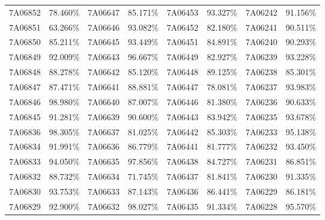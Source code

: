 \documentclass[12pt]{article}%
\begin{document}
\begin{longtable}{|cc|cc|cc|cc|}
7A06852              & 78.460\% & 7A06647              & 85.171\% & 7A06453              & 93.327\% & \multicolumn{1}{l}{7A06242             } & 91.156\% \\
7A06851              & 63.266\% & 7A06646              & 93.082\% & 7A06452              & 82.180\% & \multicolumn{1}{l}{7A06241             } & 90.511\% \\
7A06850              & 85.211\% & 7A06645              & 93.449\% & 7A06451              & 84.891\% & \multicolumn{1}{l}{7A06240             } & 90.293\% \\
7A06849              & 92.009\% & 7A06643              & 96.667\% & 7A06449              & 82.927\% & \multicolumn{1}{l}{7A06239             } & 93.228\% \\
7A06848              & 88.278\% & 7A06642              & 85.120\% & 7A06448              & 89.125\% & \multicolumn{1}{l}{7A06238             } & 85.301\% \\
7A06847              & 87.471\% & 7A06641              & 88.881\% & 7A06447              & 78.081\% & \multicolumn{1}{l}{7A06237             } & 93.983\% \\
7A06846              & 98.980\% & 7A06640              & 87.007\% & 7A06446              & 81.380\% & \multicolumn{1}{l}{7A06236             } & 90.633\% \\
7A06845              & 91.281\% & 7A06639              & 90.600\% & 7A06443              & 83.942\% & \multicolumn{1}{l}{7A06235             } & 93.678\% \\
7A06836              & 98.305\% & 7A06637              & 81.025\% & 7A06442              & 85.303\% & \multicolumn{1}{l}{7A06233             } & 95.138\% \\
7A06834              & 91.991\% & 7A06636              & 86.779\% & 7A06441              & 81.777\% & \multicolumn{1}{l}{7A06232             } & 93.450\% \\
7A06833              & 94.050\% & 7A06635              & 97.856\% & 7A06438              & 84.727\% & \multicolumn{1}{l}{7A06231             } & 86.851\% \\
7A06832              & 88.732\% & 7A06634              & 71.745\% & 7A06437              & 81.841\% & \multicolumn{1}{l}{7A06230             } & 91.335\% \\
7A06830              & 93.753\% & 7A06633              & 87.143\% & 7A06436              & 86.441\% & \multicolumn{1}{l}{7A06229             } & 86.181\% \\
7A06829              & 92.900\% & 7A06632              & 98.027\% & 7A06435              & 91.334\% & \multicolumn{1}{l}{7A06228             } & 95.570\% \\

\end{longtable}
\end{document}

